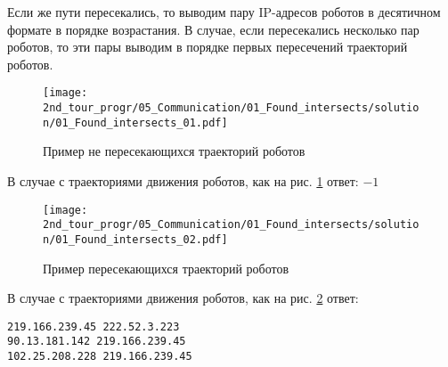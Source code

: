 Если же пути пересекались, то выводим пару IP-адресов роботов в десятичном формате в порядке возрастания. В случае, если пересекались несколько пар роботов, то эти пары выводим в порядке первых пересечений траекторий роботов.\\

\begin{figure}[H]
	\centering
	\texttt{[image: 2nd\_tour\_progr/05\_Communication/01\_Found\_intersects/solution/01\_Found\_intersects\_01.pdf]}
	\caption{Пример не пересекающихся траекторий роботов}
	\label{fig:01_Found_intersects_01}
\end{figure}

В случае с траекториями движения роботов, как на рис. \ref{fig:01_Found_intersects_01} ответ: $-1$


\begin{figure}[H]
	\centering
	\texttt{[image: 2nd\_tour\_progr/05\_Communication/01\_Found\_intersects/solution/01\_Found\_intersects\_02.pdf]}
	\caption{Пример пересекающихся траекторий роботов}
	\label{fig:01_Found_intersects_02}
\end{figure}

В случае с траекториями движения роботов, как на рис. \ref{fig:01_Found_intersects_02} ответ: \\

\begin{verbatim}
219.166.239.45 222.52.3.223
90.13.181.142 219.166.239.45
102.25.208.228 219.166.239.45
\end{verbatim}


\codeExample

